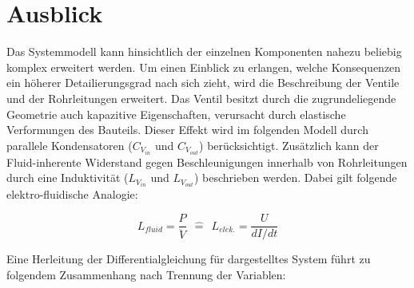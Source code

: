 \documentclass[fontsize=12pt, a4paper]{scrartcl}
\let\stdsection\section 	%
\renewcommand\section{\newpage\stdsection}
\begin{document}
\section{Ausblick}

Das Systemmodell kann hinsichtlich der einzelnen Komponenten nahezu beliebig komplex erweitert werden. Um einen Einblick zu erlangen, welche Konsequenzen ein höherer Detailierungsgrad nach sich zieht, wird die Beschreibung der Ventile und der Rohrleitungen erweitert. Das Ventil besitzt durch die zugrundeliegende Geometrie auch kapazitive Eigenschaften, verursacht durch elastische Verformungen des Bauteils. Dieser Effekt wird im folgenden Modell durch parallele Kondensatoren ($C_V_{in}$ und $C_V_{out}$) berücksichtigt. Zusätzlich kann der Fluid-inherente Widerstand gegen Beschleunigungen innerhalb von Rohrleitungen durch eine Induktivität ($L_V_{in}$ und $L_V_{out}$) beschrieben werden. Dabei gilt folgende elektro-fluidische Analogie:


\[ L_{fluid} = \frac{P}{\ddot{V}} \:\:\widehat{=}\:\: L_{elek.} = \frac{U}{dI/dt} \]

\begin{center}
	
\end{center}

Eine Herleitung der Differentialgleichung für dargestelltes System führt zu folgendem Zusammenhang nach Trennung der Variablen:
\end{document}
